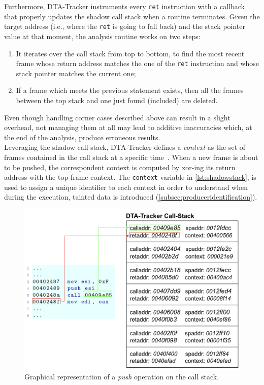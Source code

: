 \documentclass[LaM,binding=0.6cm]{sapthesis}
\begin{document}
Furthermore, {\sf DTA-Tracker} instruments every \texttt{ret} instruction with a callback that properly updates the shadow call stack when a routine terminates. Given the target address (i.e., where the \texttt{ret} is going to fall back) and the stack pointer value at that moment, the analysis routine works on two steps:
\begin{enumerate}
\item It iterates over the call stack from top to bottom, to find the most recent frame whose return address matches the one of the \texttt{ret} instruction and whose stack pointer matches the current one;
\item If a frame which meets the previous statement exists, then all the frames between the top stack and one just found (included) are deleted. 
\end{enumerate}
Even though handling corner cases described above can result in a slight overhead, not managing them at all may lead to additive inaccuracies which, at the end of the analysis, produce erroneous results.\\

Leveraging the shadow call stack, {\sf DTA-Tracker} defines a \textit{context} as the set of frames contained in the call stack at a specific time~\cite{hcct}. When a new frame is about to be pushed, the correspondent context is computed by xor-ing its return address with the top frame context. The \texttt{context} variable in \autoref{lst:shadowstack}, is used to assign a unique identifier to each context in order to understand when during the execution, tainted data is introduced (\autoref{subsec:produceridentification}).

\begin{figure}[h!]
\centering
\includegraphics[scale=.5]{images/dtatracker2}
\caption{Graphical representation of a \textit{push} operation on the call stack.}
\end{figure}
\newpage
\end{document}
